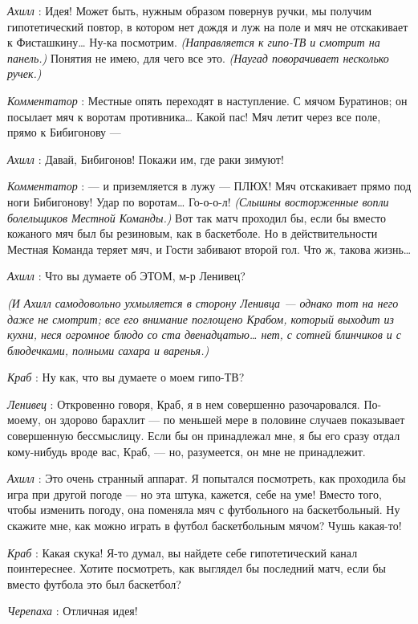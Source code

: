\documentclass[../main.tex]{subfiles}
\begin{document}
\begin{dialogue}
\emph{Ахилл} : Идея! Может быть, нужным образом повернув ручки, мы получим гипотетический повтор, в котором нет дождя и луж на поле и мяч не отскакивает к Фисташкину\ldots{} Ну-ка посмотрим. \emph{(Направляется к гипо-ТВ и смотрит на панель.)} Понятия не имею, для чего все это. \emph{(Наугад поворачивает несколько ручек.)}

\emph{Комментатор} : Местные опять переходят в наступление. С мячом Буратинов; он посылает мяч к воротам противника\ldots{} Какой пас! Мяч летит через все поле, прямо к Бибигонову ---

\emph{Ахилл} : Давай, Бибигонов! Покажи им, где раки зимуют!

\emph{Комментатор} : --- и приземляется в лужу --- ПЛЮХ! Мяч отскакивает прямо под ноги Бибигонову! Удар по воротам\ldots{} Го-о-о-л! \emph{(Слышны восторженные вопли болельщиков Местной Команды.)} Вот так матч проходил бы, если бы вместо кожаного мяч был бы резиновым, как в баскетболе. Но в действительности Местная Команда теряет мяч, и Гости забивают второй гол. Что ж, такова жизнь\ldots{}

\emph{Ахилл} : Что вы думаете об ЭТОМ, м-р Ленивец?

\emph{(И Ахилл самодовольно ухмыляется в сторону Ленивца --- однако тот на него даже не смотрит; все его внимание поглощено Крабом, который выходит из кухни, неся огромное блюдо со ста двенадцатью\ldots{} нет, с сотней блинчиков и с блюдечками, полными сахара и варенья.)}

\emph{Краб} : Ну как, что вы думаете о моем гипо-ТВ?

\emph{Ленивец} : Откровенно говоря, Краб, я в нем совершенно разочаровался. По-моему, он здорово барахлит --- по меньшей мере в половине случаев показывает совершенную бессмыслицу. Если бы он принадлежал мне, я бы его сразу отдал кому-нибудь вроде вас, Краб, --- но, разумеется, он мне не принадлежит.

\emph{Ахилл} : Это очень странный аппарат. Я попытался посмотреть, как проходила бы игра при другой погоде --- но эта штука, кажется, себе на уме! Вместо того, чтобы изменить погоду, она поменяла мяч с футбольного на баскетбольный. Ну скажите мне, как можно играть в футбол баскетбольным мячом? Чушь какая-то!

\emph{Краб} : Какая скука! Я-то думал, вы найдете себе гипотетический канал поинтереснее. Хотите посмотреть, как выглядел бы последний матч, если бы вместо футбола это был баскетбол?

\emph{Черепаха} : Отличная идея!


\end{dialogue}
\end{document}
